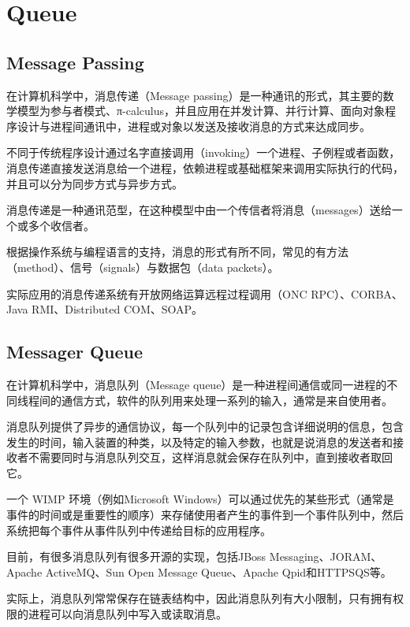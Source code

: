 \section{Queue}


\subsection{Message Passing}

在计算机科学中，消息传递（Message passing）是一种通讯的形式，其主要的数学模型为参与者模式、π-calculus，并且应用在并发计算、并行计算、面向对象程序设计与进程间通讯中，进程或对象以发送及接收消息的方式来达成同步。

不同于传统程序设计通过名字直接调用（invoking）一个进程、子例程或者函数，消息传递直接发送消息给一个进程，依赖进程或基础框架来调用实际执行的代码，并且可以分为同步方式与异步方式。

消息传递是一种通讯范型，在这种模型中由一个传信者将消息（messages）送给一个或多个收信者。

根据操作系统与编程语言的支持，消息的形式有所不同，常见的有方法（method）、信号（signals）与数据包（data packets）。

实际应用的消息传递系统有开放网络运算远程过程调用（ONC RPC）、CORBA、Java RMI、Distributed COM、SOAP。



\subsection{Messager Queue}


在计算机科学中，消息队列（Message queue）是一种进程间通信或同一进程的不同线程间的通信方式，软件的队列用来处理一系列的输入，通常是来自使用者。

消息队列提供了异步的通信协议，每一个队列中的记录包含详细说明的信息，包含发生的时间，输入装置的种类，以及特定的输入参数，也就是说消息的发送者和接收者不需要同时与消息队列交互，这样消息就会保存在队列中，直到接收者取回它。

一个 WIMP 环境（例如Microsoft Windows）可以通过优先的某些形式（通常是事件的时间或是重要性的顺序）来存储使用者产生的事件到一个事件队列中，然后系统把每个事件从事件队列中传递给目标的应用程序。


目前，有很多消息队列有很多开源的实现，包括JBoss Messaging、JORAM、Apache ActiveMQ、Sun Open Message Queue、Apache Qpid和HTTPSQS等。

实际上，消息队列常常保存在链表结构中，因此消息队列有大小限制，只有拥有权限的进程可以向消息队列中写入或读取消息。

